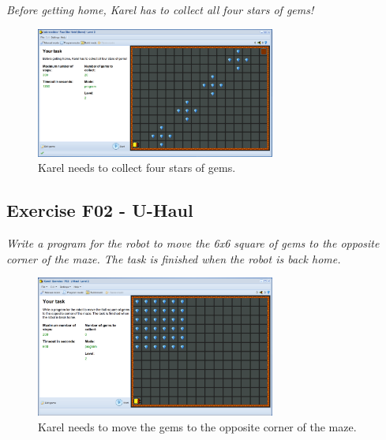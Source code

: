 \documentclass[article,A4,12pt]{llncs}
\begin{document}
{\em Before getting home, Karel has to collect all four stars of gems!}


\begin{figure}[!ht]
\begin{center}
\includegraphics[width=0.7\textwidth]{img/f01.png}
\end{center}
\vspace{-4mm}
\caption{Karel needs to collect four stars of gems.}
\label{fig:f01}
\vspace{-10mm}
\end{figure}
\noindent

\subsection{Exercise F02 - U-Haul}

{\em Write a program for the robot to move the 6x6 square of gems to the opposite corner of the maze. The task is finished when the robot is back home.}
\newpage

\begin{figure}[!ht]
\begin{center}
\includegraphics[width=0.7\textwidth]{img/f02.png}
\end{center}
\vspace{-4mm}
\caption{Karel needs to move the gems to the opposite corner of the maze.}
\label{fig:f02}
\vspace{-10mm}
\end{figure}
\noindent
\end{document}
